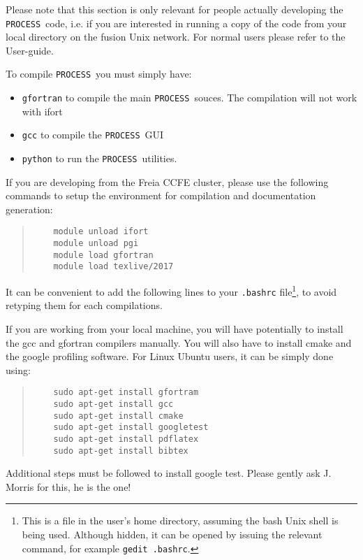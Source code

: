 \documentclass[11pt,a4paper]{report}
\newcommand{\process}{\mbox{\texttt{PROCESS}}}
\begin{document}
Please note that this section is only relevant for people actually developing the \process\  code, i.e. if you are interested in running a copy of the code from your local directory on the fusion Unix network. For normal users please refer to the User-guide.

To compile \process\ you must simply have:
\begin{itemize}
	\item \texttt{gfortran} to compile the main \process\ souces. The compilation will not work with ifort
	\item \texttt{gcc} to compile the \process\ GUI
	\item \texttt{python} to run the \process\ utilities.
\end{itemize}

If you are developing from the Freia CCFE cluster, please use the following commands to setup the environment for compilation and documentation generation:
\begin{quote}
	\begin{verbatim}	
	module unload ifort
	module unload pgi
	module load gfortran
	module load texlive/2017
	\end{verbatim}
\end{quote}

It can be convenient to add the following lines to your \texttt{.bashrc} file\footnote{ This is a file in the user's home directory, assuming the bash Unix shell is being used. Although hidden, it can be opened by issuing the relevant command, for example \texttt{gedit .bashrc}.}, to avoid retyping them for each compilations.\newline

If you are working from your local machine, you will have potentially to install the gcc and gfortran compilers manually. You will also have to install cmake and the google profiling software. For Linux Ubuntu users, it can be simply done using:

\begin{quote}
	\begin{verbatim}
	sudo apt-get install gfortram
	sudo apt-get install gcc
	sudo apt-get install cmake
	sudo apt-get install googletest
	sudo apt-get install pdflatex
	sudo apt-get install bibtex
	\end{verbatim}
\end{quote}

Additional steps must be followed to install google test. Please gently ask J. Morris for this, he is the one!
\end{document}
